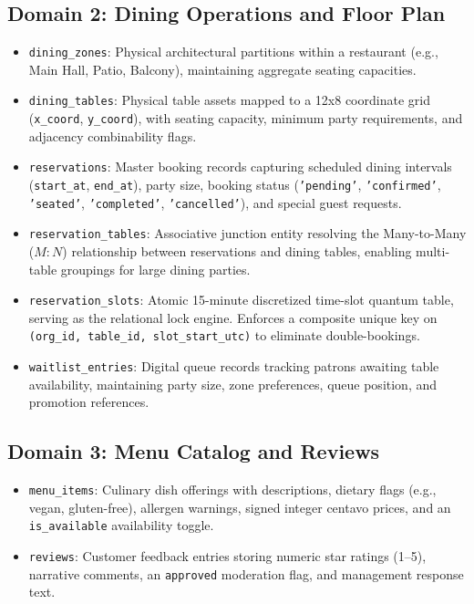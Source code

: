 \subsection{Domain 2: Dining Operations and Floor Plan}
\begin{itemize}
    \item \texttt{dining\_zones}: Physical architectural partitions within a restaurant (e.g., Main Hall, Patio, Balcony), maintaining aggregate seating capacities.
    \item \texttt{dining\_tables}: Physical table assets mapped to a 12x8 coordinate grid (\texttt{x\_coord}, \texttt{y\_coord}), with seating capacity, minimum party requirements, and adjacency combinability flags.
    \item \texttt{reservations}: Master booking records capturing scheduled dining intervals (\texttt{start\_at}, \texttt{end\_at}), party size, booking status (\texttt{'pending'}, \texttt{'confirmed'}, \texttt{'seated'}, \texttt{'completed'}, \texttt{'cancelled'}), and special guest requests.
    \item \texttt{reservation\_tables}: Associative junction entity resolving the Many-to-Many ($M:N$) relationship between reservations and dining tables, enabling multi-table groupings for large dining parties.
    \item \texttt{reservation\_slots}: Atomic 15-minute discretized time-slot quantum table, serving as the relational lock engine. Enforces a composite unique key on \texttt{(org\_id, table\_id, slot\_start\_utc)} to eliminate double-bookings.
    \item \texttt{waitlist\_entries}: Digital queue records tracking patrons awaiting table availability, maintaining party size, zone preferences, queue position, and promotion references.
\end{itemize}

\subsection{Domain 3: Menu Catalog and Reviews}
\begin{itemize}
    \item \texttt{menu\_items}: Culinary dish offerings with descriptions, dietary flags (e.g., vegan, gluten-free), allergen warnings, signed integer centavo prices, and an \texttt{is\_available} availability toggle.
    \item \texttt{reviews}: Customer feedback entries storing numeric star ratings (1--5), narrative comments, an \texttt{approved} moderation flag, and management response text.
\end{itemize}

